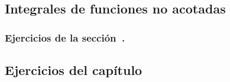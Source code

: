 \subsection{Integrales de funciones no acotadas}

\subsubsection*{Ejercicios de la sección~.}

\begin{enumerate}
  
\end{enumerate}






%   



\subsection*{Ejercicios del capítulo~}


\begin{enumerate}
  
  
  
  
  
  
  
  
  
\end{enumerate}

